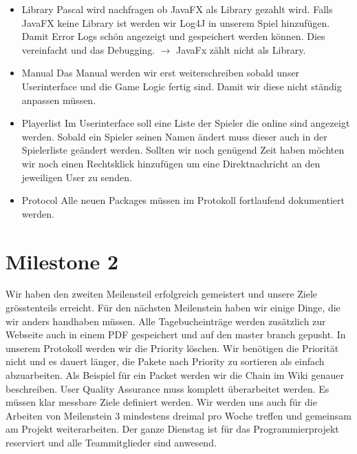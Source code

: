 \documentclass{scrartcl}
\newcommand{\n}{\newline}
\begin{document}
\begin{itemize}
	\item Library \n
	Pascal wird nachfragen ob JavaFX als Library gezahlt wird. Falls JavaFX keine Library ist werden wir Log4J in unserem Spiel hinzufügen. Damit Error Logs schön angezeigt und gespeichert werden können. Dies vereinfacht und das Debugging. \n
	$\rightarrow$ JavaFx zählt nicht als Library.
	\item Manual \n
	Das Manual werden wir erst weiterschreiben sobald unser Userinterface und die Game Logic fertig sind. Damit wir diese nicht ständig anpassen müssen. 
	\item Playerlist \n
	Im Userinterface soll eine Liste der Spieler die online sind angezeigt werden. Sobald ein Spieler seinen Namen ändert muss dieser auch in der Spielerliste geändert werden. Sollten wir noch genügend Zeit haben möchten wir noch einen Rechtsklick hinzufügen um eine Direktnachricht an den jeweiligen User zu senden. 
	\item Protocol \n
	Alle neuen Packages müssen im Protokoll fortlaufend dokumentiert werden. 
	

\end{itemize}

\section*{Milestone 2}
Wir haben den zweiten Meilensteil erfolgreich gemeistert und unsere Ziele grösstenteils erreicht. Für den nächsten Meilenstein haben wir einige Dinge, die wir anders handhaben müssen. Alle Tagebucheinträge werden zusätzlich zur Webseite auch in einem PDF gespeichert und auf den master branch gepusht. In unserem Protokoll werden wir die Priority löschen. Wir benötigen die Priorität nicht und es dauert länger, die Pakete nach Priority zu sortieren als einfach abzuarbeiten. Als Beispiel für ein Packet werden wir die Chain im Wiki genauer beschreiben. User Quality Assurance muss komplett überarbeitet werden. Es müssen klar messbare Ziele definiert werden. Wir werden uns auch für die Arbeiten von Meilenstein 3 mindestens dreimal pro Woche treffen und gemeinsam am Projekt weiterarbeiten. Der ganze Dienstag ist für das Programmierprojekt reserviert und alle Teammitglieder sind anwesend.

\end{document}
